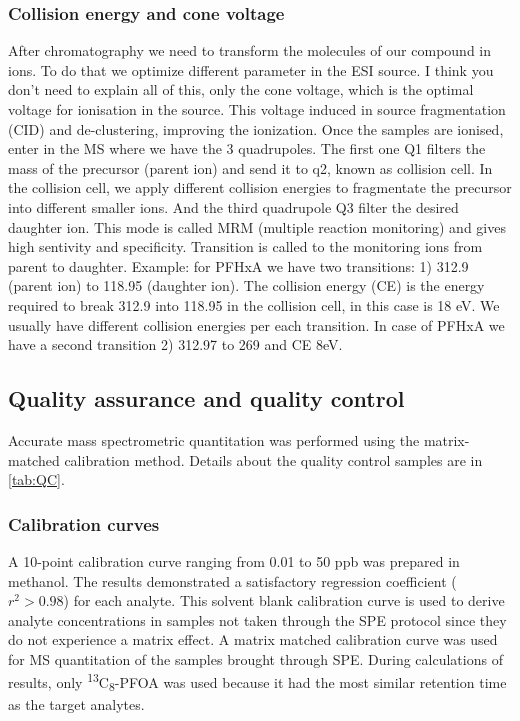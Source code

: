 \subsubsection{Collision energy and cone voltage}
After chromatography we need to transform the molecules of our compound in ions. To do that we optimize different parameter in the ESI source. I think you don’t need to explain all of this, only the cone voltage, which is the optimal voltage for ionisation in the source. This voltage induced in source fragmentation (CID) and de-clustering, improving the ionization. Once the samples are ionised, enter in the MS where we have the 3 quadrupoles. The first one Q1 filters the mass of the precursor (parent ion) and send it to q2, known as collision cell. In the collision cell, we apply different collision energies to fragmentate the precursor into different smaller ions. And the third quadrupole Q3 filter the desired daughter ion. This mode is called MRM (multiple reaction monitoring) and gives high sentivity and specificity.
Transition is called to the monitoring ions from parent to daughter. 
Example: for PFHxA we have two transitions:
1)  312.9 (parent ion) to 118.95 (daughter ion). The collision energy (CE) is the energy required to break 312.9 into 118.95 in the collision cell, in this case is 18 eV. We usually have different collision energies per each transition. In case of PFHxA we have a second transition 
2)  312.97 to 269 and CE 8eV.

\subsection{Quality assurance and quality control}
Accurate mass spectrometric quantitation was performed using the matrix-matched calibration method. Details about the quality control samples are in \cref{tab:QC}.

\subsubsection{Calibration curves}
A 10-point calibration curve ranging from 0.01 to 50 ppb was prepared in methanol. The results demonstrated a satisfactory regression coefficient ($r^2 > 0.98$) for each analyte. This solvent blank calibration curve is used to derive analyte concentrations in samples not taken through the SPE protocol since they do not experience a matrix effect. A matrix matched calibration curve was used for MS quantitation of the samples brought through SPE. 
During calculations of results, only \textsuperscript{13}C\textsubscript{8}-PFOA was used because it had the most similar retention time as the target analytes. 

